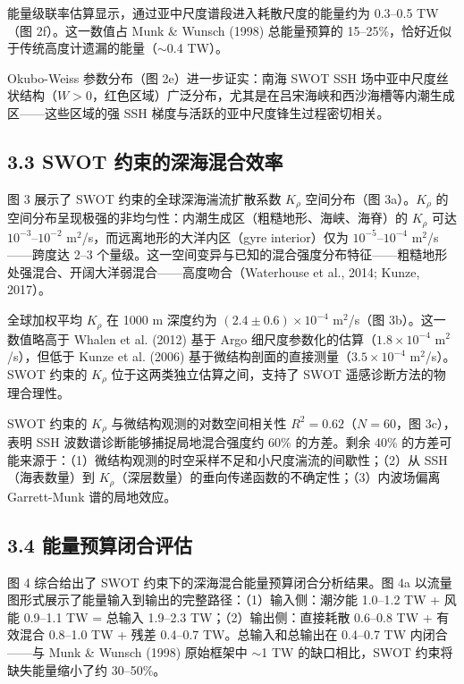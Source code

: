 \documentclass[11pt,a4paper]{article}
\begin{document}
能量级联率估算显示，通过亚中尺度谱段进入耗散尺度的能量约为 0.3--0.5 TW（图 2f）。这一数值占 Munk \& Wunsch (1998) 总能量预算的 15--25\%，恰好近似于传统高度计遗漏的能量（$\sim$0.4 TW）。\par

Okubo-Weiss 参数分布（图 2e）进一步证实：南海 SWOT SSH 场中亚中尺度丝状结构（$W>0$，红色区域）广泛分布，尤其是在吕宋海峡和西沙海槽等内潮生成区——这些区域的强 SSH 梯度与活跃的亚中尺度锋生过程密切相关。\par

\subsection*{3.3  SWOT 约束的深海混合效率}

图 3 展示了 SWOT 约束的全球深海湍流扩散系数 $K_\rho$ 空间分布（图 3a）。$K_\rho$ 的空间分布呈现极强的非均匀性：内潮生成区（粗糙地形、海峡、海脊）的 $K_\rho$ 可达 $10^{-3}$--$10^{-2}$ m$^2$/s，而远离地形的大洋内区（gyre interior）仅为 $10^{-5}$--$10^{-4}$ m$^2$/s——跨度达 2--3 个量级。这一空间变异与已知的混合强度分布特征——粗糙地形处强混合、开阔大洋弱混合——高度吻合（Waterhouse et al., 2014; Kunze, 2017）。\par

全球加权平均 $K_\rho$ 在 1000 m 深度约为 $(2.4 \pm 0.6) \times 10^{-4}$ m$^2$/s（图 3b）。这一数值略高于 Whalen et al. (2012) 基于 Argo 细尺度参数化的估算（$1.8 \times 10^{-4}$ m$^2$/s），但低于 Kunze et al. (2006) 基于微结构剖面的直接测量（$3.5 \times 10^{-4}$ m$^2$/s）。SWOT 约束的 $K_\rho$ 位于这两类独立估算之间，支持了 SWOT 遥感诊断方法的物理合理性。\par

SWOT 约束的 $K_\rho$ 与微结构观测的对数空间相关性 $R^2 = 0.62$（$N = 60$，图 3c），表明 SSH 波数谱诊断能够捕捉局地混合强度约 60\% 的方差。剩余 40\% 的方差可能来源于：（1）微结构观测的时空采样不足和小尺度湍流的间歇性；（2）从 SSH（海表数量）到 $K_\rho$（深层数量）的垂向传递函数的不确定性；（3）内波场偏离 Garrett-Munk 谱的局地效应。\par

\subsection*{3.4  能量预算闭合评估}

图 4 综合给出了 SWOT 约束下的深海混合能量预算闭合分析结果。图 4a 以流量图形式展示了能量输入到输出的完整路径：（1）输入侧：潮汐能 1.0--1.2 TW + 风能 0.9--1.1 TW = 总输入 1.9--2.3 TW；（2）输出侧：直接耗散 0.6--0.8 TW + 有效混合 0.8--1.0 TW + 残差 0.4--0.7 TW。总输入和总输出在 0.4--0.7 TW 内闭合——与 Munk \& Wunsch (1998) 原始框架中 $\sim$1 TW 的缺口相比，SWOT 约束将缺失能量缩小了约 30--50\%。\par
\end{document}
